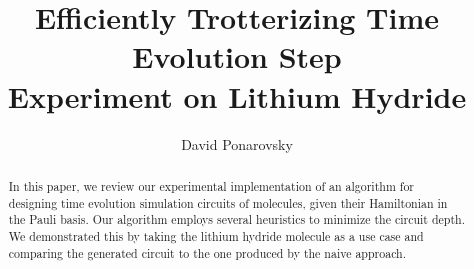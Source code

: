 \documentclass{article}
\begin{document}
    
\title{ Efficiently Trotterizing Time Evolution Step \\  Experiment on Lithium Hydride }
\author{David Ponarovsky}
\maketitle

\begin{abstract} 
In this paper, we review our experimental implementation of an algorithm for designing time evolution simulation circuits of molecules, given their Hamiltonian in the Pauli basis. Our algorithm employs several heuristics to minimize the circuit depth. We demonstrated this by taking the lithium hydride molecule as a use case and comparing the generated circuit to the one produced by the naive approach.
\end{abstract}
\end{document}
